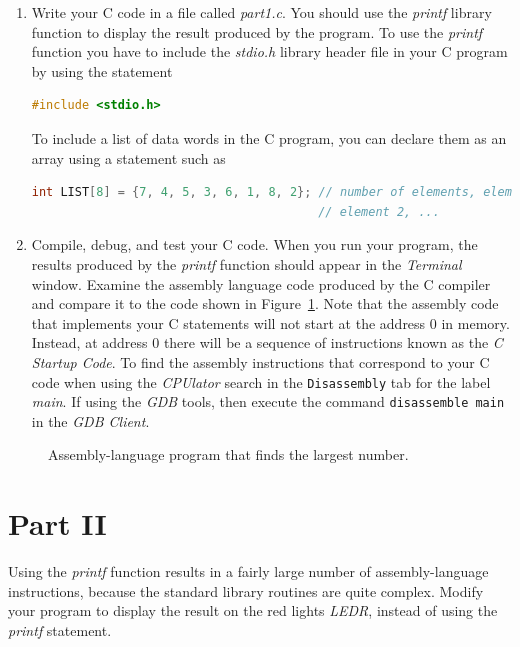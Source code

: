 \documentclass[epsfig,10pt,fullpage]{article}
\begin{document}
\begin{enumerate}
\item
Write your C code in a file called {\it part1.c}.  You should use the {\it printf}
library function to display the result produced by the program. To use the {\it printf} function 
you have to include the {\it stdio.h} library header file in your C program by using the statement

\begin{lstlisting}[language=C]
#include <stdio.h>
\end{lstlisting}

To include a list of data words in the C program, you can declare them as an array using
a statement such as

\begin{lstlisting}[language=C]
int LIST[8] = {7, 4, 5, 3, 6, 1, 8, 2}; // number of elements, element 1,
                                        // element 2, ...
\end{lstlisting}

\item
Compile, debug, and test your C code.  When you run your program, the results produced by the
{\it printf} function should appear in the {\it Terminal} window.
Examine the assembly language code produced by the C compiler and compare it to the code 
shown in Figure~\ref{fig:code}. Note that the assembly code that implements your C
statements will not start at the address 0 in memory. Instead, at address 0 there will be 
a sequence of instructions known as the {\it C Startup Code}. To find the assembly
instructions that correspond to your C code when using the {\it CPUlator} search
in the \texttt{Disassembly} tab for the label {\it main}. If using the {\it GDB} tools,
then execute the command \texttt{disassemble main} in the {\it GDB Client}.
\end{enumerate}

\begin{figure}[H]
\begin{center}

\end{center}
\caption{Assembly-language program that finds the largest number.}
\label{fig:code}
\end{figure}

\section*{Part II}
Using the {\it printf} function results in a fairly large number of assembly-language instructions,
because the standard library routines are quite complex. Modify your program to display the 
result on the red lights {\it LEDR}, instead of using the {\it printf} statement. 
\end{document}

